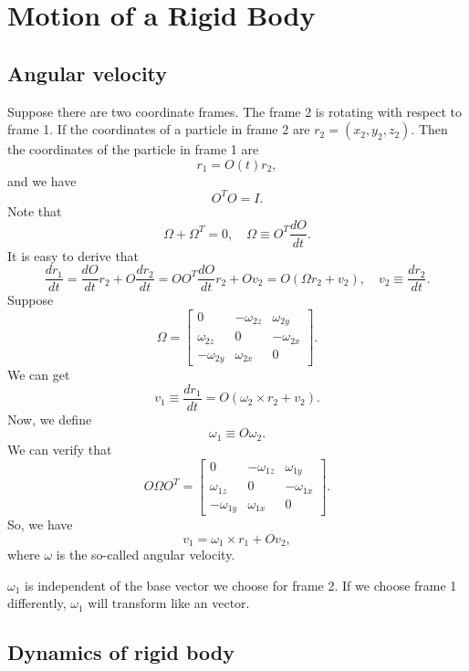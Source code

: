 \chapter{Motion of a Rigid Body}
\section{Angular velocity}
Suppose there are two coordinate frames. The frame 2 is rotating with respect to frame 1. If the coordinates of a particle in frame 2 are $r_2=(x_2,y_2,z_2)$.
Then the coordinates of the particle in frame 1 are
\[r_1 = O(t)r_2 ,\]
and we have
\[O^TO=I.\]
Note that
\[\Omega + \Omega^T= 0 ,\quad \Omega \equiv O^T\frac{dO}{dt}.\]
It is easy to derive that
\[\frac{dr_1}{dt} = \frac{dO}{dt}r_2 + O\frac{dr_2}{dt} = OO^T \frac{dO}{dt}r_2 + Ov_2  = O (\Omega r_2 + v_2) ,\quad v_2 \equiv \frac{dr_2}{dt}.\]
Suppose
\[\Omega = \left[ \begin{matrix} 0& -\omega_{2z}& \omega_{2y}\\ \omega_{2z}& 0& -\omega_{2x}\\ -\omega_{2y}& \omega_{2x}& 0\end{matrix} \right] .\]
We can get
\[v_1 \equiv \frac{dr_1}{dt}  = O(\omega_2 \times r_2 + v_2) .\]
Now, we define
\[\omega_1 \equiv O\omega_2.\]
We can verify that
\[O \Omega O^T = \left[ \begin{matrix} 0& -\omega_{1z}& \omega_{1y}\\ \omega_{1z}& 0& -\omega_{1x}\\ -\omega_{1y}& \omega_{1x}& 0\end{matrix} \right] .\]
So, we have
\[v_1 = \omega_1 \times r_1 + Ov_2 ,\]
where $\omega$ is the so-called angular velocity.
\begin{note}
$\omega_1$ is independent of the base vector we choose for frame 2.
If we choose frame 1 differently, $\omega_1$ will transform like an vector.
\end{note}

\section{Dynamics of rigid body}
